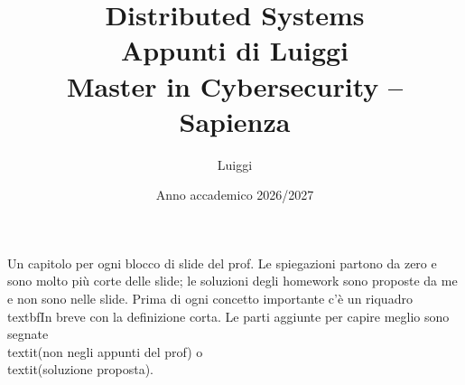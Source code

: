 \documentclass[11pt,a4paper]{report}
\title{\textbf{Distributed Systems}\\[0.5em]\large Appunti di Luiggi\\[0.3em]\normalsize Master in Cybersecurity -- Sapienza}
\author{Luiggi}
\date{Anno accademico 2026/2027}
\begin{document}
\maketitle

\noindent Un capitolo per ogni blocco di slide del prof. Le spiegazioni partono da zero e sono molto più corte delle slide; le soluzioni degli homework sono proposte da me e non sono nelle slide. Prima di ogni concetto importante c'è un riquadro \\textbf{In breve} con la definizione corta. Le parti aggiunte per capire meglio sono segnate \\textit{(non negli appunti del prof)} o \\textit{(soluzione proposta)}.

\tableofcontents





\end{document}
